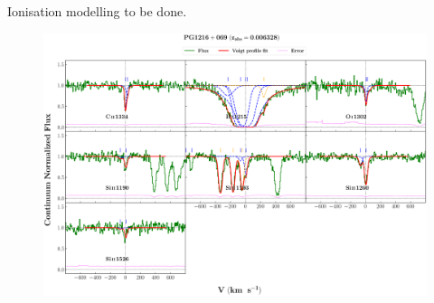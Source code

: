\documentclass[12pt]{report}
\begin{document}
Ionisation modelling to be done.


\newpage

\begin{landscape}

\begin{figure}
    \centering
    \vspace{-20mm}
    \hspace*{-35mm}
    \includegraphics[width=1.25\linewidth]{System-Plots/PG1216+069_z=0.006328_sys_plot.png}
\end{figure}

\end{landscape}
\end{document}
